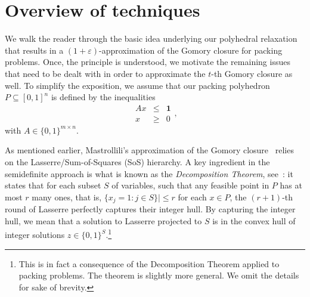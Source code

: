\documentclass[11pt]{article}
\newcommand{\fritztodo}[1]{\todo[backgroundcolor=cyantransparent, linecolor=cyan!80]{#1}}
\newcommand{\jiayetodo}[1]{\todo[backgroundcolor=greentransparent, linecolor=green!80]{#1}}
\newcommand{\one}{\mathbf{1}}
\theoremstyle{remark}
\begin{document}





\section{Overview of techniques}
\label{sec:r-neighb-relax}

We walk the reader through the basic idea underlying our polyhedral relaxation  that results in a $(1+ε)$-approximation of the Gomory closure for packing problems. Once, the principle is understood, we motivate the remaining issues that need to be dealt with in order to approximate the $t$-th Gomory closure as well. To simplify the exposition, we assume that our packing polyhedron $P ⊆ [0,1]^n$ is defined by the inequalities
\begin{equation}
  \label{eq:1}
  \begin{array}{rcl}
    Ax &≤& \one \\
    x & ≥ & 0
  \end{array}, 
\end{equation}
with $A ∈ \{0,1\}^{m ×n}$.

As mentioned earlier, Mastrollili's approximation of the Gomory closure~\cite{mas20} relies on
the Lasserre/Sum-of-Squares (SoS) hierarchy.
A key ingredient in the semidefinite approach %
 is what is known as the \emph{Decomposition Theorem}, see~\cite{kmn11}:
it states that for each subset $S$ of variables, such that any feasible point in $P$ has at most $r$ many ones,
that is, $\{ x_j = 1 : j\in S \}| \le r$ for each $x\in P$, 
the $(r+1)$-th round of Lasserre perfectly captures their integer hull.
By capturing the integer hull, we mean that
a solution to Lasserre projected to $S$ is in the convex hull of integer solutions $z\in \{0,1\}^S$.\footnote{This is in fact a consequence of the Decomposition Theorem applied to packing problems. The theorem is slightly more general. We omit the details for sake of brevity.}
\end{document}

